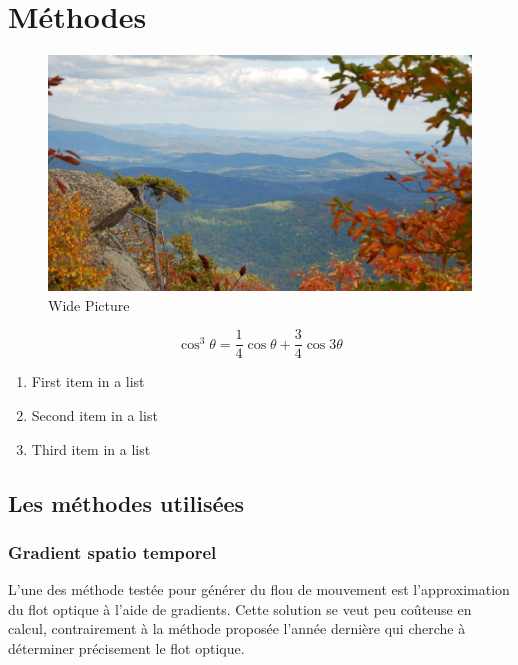\documentclass[fleqn,10pt]{SelfArx} %
\begin{document}

\section{Méthodes}

\begin{figure}[ht]\centering %
\includegraphics[width=\linewidth]{view}
\caption{Wide Picture}
\label{fig:view}
\end{figure}

\lipsum[4] %

\begin{equation}
\cos^3 \theta =\frac{1}{4}\cos\theta+\frac{3}{4}\cos 3\theta
\label{eq:refname2}
\end{equation}

\lipsum[5] %

\begin{enumerate}[noitemsep] %
\item First item in a list
\item Second item in a list
\item Third item in a list
\end{enumerate}

\subsection{Les méthodes utilisées}
%
\subsubsection{Gradient spatio temporel}
L'une des méthode testée pour générer du flou de mouvement est l'approximation du flot optique à l'aide de
gradients.
Cette solution se veut peu coûteuse en calcul, contrairement à la méthode proposée l'année dernière qui
cherche à déterminer précisement le flot optique.
\end{document}
